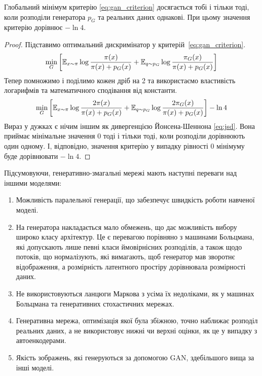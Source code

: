 \begin{theorem}
    Глобальний мінімум критерію \eqref{eq:gan_criterion} досягається
    тобі і тільки тоді, коли розподіли генератора $p_G$ та реальних даних
    однакові. При цьому значення критерію дорівнює $-\ln 4$.
\end{theorem}
\begin{proof}
    Підставимо оптимальний дискримінатор у критерій~\eqref{eq:gan_criterion}.
    \begin{equation*}
        \min\limits_{G} \left[
            \operatorname{\mathbb{E}}_{x \sim \pi} \log \frac{\pi(x)}{\pi(x) + p_G(x)} +
            \operatorname{\mathbb{E}}_{q \sim p_G} \log \frac{\pi_G(x)}{\pi(x) + p_G(x)}
            \right]
    \end{equation*}
    Тепер помножимо і поділимо кожен дріб на 2 та використаємо властивість
    логарифмів та математичного сподівання від константи.
    \begin{equation*}
        \min\limits_{G} \left[
            \operatorname{\mathbb{E}}_{x \sim \pi} \log \frac{2 \pi(x)}{\pi(x) + p_G(x)} +
            \operatorname{\mathbb{E}}_{q \sim p_G} \log \frac{2 \pi_G(x)}{\pi(x) + p_G(x)}
            \right] - \ln 4
    \end{equation*}
    Вираз у дужках є нічим іншим як дивергенцією Йонсена-Шеннона \eqref{eq:jsd}.
    Вона приймає мінімальне значення $0$ тоді і тільки тоді, коли
    розподіли дорівнюють один одному. І, відповідно, значення критерію
    у випадку рівності $0$ мінімуму буде дорівнювати $-\ln 4$.
\end{proof}

Підсумовуючи, генеративно-змагальні мережі мають наступні
переваги над іншими моделями:
\begin{enumerate}
    \item Можливість паралельної генерації,
          що забезпечує швидкість роботи навченої моделі.
    \item На генератора накладається мало обмежень, що дає можливість
          вибору широко класу архітектур.
          Це є перевагою порівняно з машинами Больцмана,
          які допускають лише певні класи  ймовірнісних розподілів,
          а також щодо потоків, що нормалізують, які вимагають, щоб генератор
          мав зворотнє відображення, а розмірність латентного простіру
          дорівнювала розмірності даних.
    \item Не використовуються ланцюги Маркова з усіма їх
          недоліками, як у машинах Больцмана та генеративних стохастичних мережах.
    \item Генеративна мережа, оптимізація якої була збіжною, точно наближає
          розподіл реальних даних, а не використовує нижні чи верхні
          оцінки, як це у випадку з автоенкодерами.
    \item Якість зображень, які генеруються за допомогою GAN,
          здебільшого вища за інші моделі.
\end{enumerate}

